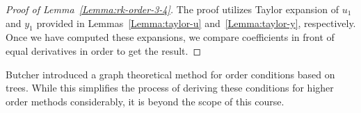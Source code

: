 \begin{proof}[Proof of Lemma~\ref{Lemma:rk-order-3-4}]
  The proof utilizes Taylor expansion of $u_1$ and $y_1$ provided in
  Lemmas~\ref{Lemma:taylor-u} and~\ref{Lemma:taylor-y},
  respectively. Once we have computed these expansions, we compare
  coefficients in front of equal derivatives in order to get the result.
\end{proof}

\begin{remark}
  Butcher introduced a graph theoretical method for order conditions
  based on trees. While this simplifies the process of deriving these
  conditions for higher order methods considerably, it is beyond the
  scope of this course.
\end{remark}



